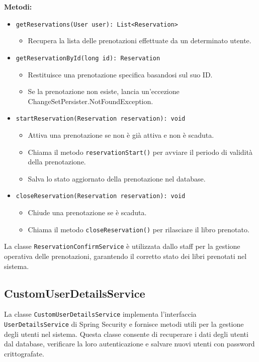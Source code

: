 \documentclass[twoside,openright,titlepage,fleqn,headinclude,12pt,a4paper,BCOR=5mm,footinclude]{scrbook}
\begin{document}
\textbf{Metodi:}  
\begin{itemize}  
    \item \texttt{getReservations(User user): List<Reservation>}  
    \begin{itemize}  
        \item Recupera la lista delle prenotazioni effettuate da un determinato utente.  
    \end{itemize}  

    \item \texttt{getReservationById(long id): Reservation}  
    \begin{itemize}  
        \item Restituisce una prenotazione specifica basandosi sul suo ID.  
        \item Se la prenotazione non esiste, lancia un'eccezione ChangeSetPersister.NotFoundException.  
    \end{itemize}  

    \item \texttt{startReservation(Reservation reservation): void}  
    \begin{itemize}  
        \item Attiva una prenotazione se non è già attiva e non è scaduta.  
        \item Chiama il metodo \texttt{reservationStart()} per avviare il periodo di validità della prenotazione.  
        \item Salva lo stato aggiornato della prenotazione nel database.  
    \end{itemize}  

    \item \texttt{closeReservation(Reservation reservation): void}  
    \begin{itemize}  
        \item Chiude una prenotazione se è scaduta.  
        \item Chiama il metodo \texttt{closeReservation()} per rilasciare il libro prenotato.  
    \end{itemize}  
\end{itemize}  

La classe \texttt{ReservationConfirmService} è utilizzata dallo staff per la gestione operativa delle prenotazioni, garantendo il corretto stato dei libri prenotati nel sistema.



\subsection{CustomUserDetailsService}
La classe \texttt{CustomUserDetailsService} implementa l'interfaccia \texttt{UserDetailsService} di Spring Security e fornisce metodi utili per la gestione degli utenti nel sistema. Questa classe consente di recuperare i dati degli utenti dal database, verificare la loro autenticazione e salvare nuovi utenti con password crittografate.
\end{document}

